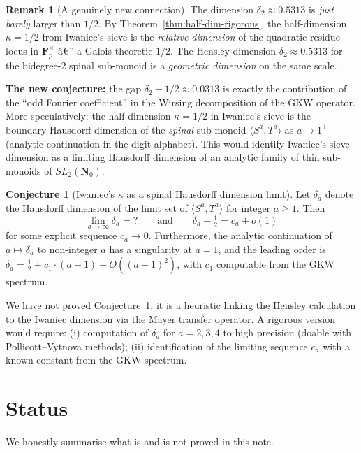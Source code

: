 ﻿\documentclass[11pt]{article}
\theoremstyle{definition}
\newtheorem{remark}[theorem]{Remark}
\newtheorem{conjecture}[theorem]{Conjecture}
\newcommand{\Nz}{\mathbf{N}_0}
\newcommand{\F}{\mathbf{F}}
\newcommand{\SLNz}{SL_2(\Nz)}
\begin{document}
\begin{remark}[A genuinely new connection]\label{rem:new-connection}
The dimension $\delta_2\approx 0.5313$ is \emph{just barely} larger than $1/2$. By Theorem~\ref{thm:half-dim-rigorous}, the half-dimension $\kappa=1/2$ from Iwaniec's sieve is the \emph{relative dimension} of the quadratic-residue locus in $\F_p^\times$ â€” a Galois-theoretic $1/2$. The Hensley dimension $\delta_2\approx 0.5313$ for the bidegree-$2$ spinal sub-monoid is a \emph{geometric dimension} on the same scale.

\textbf{The new conjecture:} the gap $\delta_2-1/2\approx 0.0313$ is exactly the contribution of the ``odd Fourier coefficient'' in the Wirsing decomposition of the GKW operator. More speculatively: the half-dimension $\kappa=1/2$ in Iwaniec's sieve is the boundary-Hausdorff dimension of the \emph{spinal} sub-monoid $\langle S^a,T^a\rangle$ as $a\to 1^+$ (analytic continuation in the digit alphabet). This would identify Iwaniec's sieve dimension as a limiting Hausdorff dimension of an analytic family of thin sub-monoids of $\SLNz$.
\end{remark}

\begin{conjecture}[Iwaniec's $\kappa$ as a spinal Hausdorff dimension limit]\label{conj:spinal-limit}
Let $\delta_a$ denote the Hausdorff dimension of the limit set of $\langle S^a,T^a\rangle$ for integer $a\ge 1$. Then
\[
\lim_{a\to\infty}\delta_a = ?\qquad\text{and}\qquad \delta_a - \tfrac{1}{2} = c_a + o(1)
\]
for some explicit sequence $c_a\to 0$. Furthermore, the analytic continuation of $a\mapsto\delta_a$ to non-integer $a$ has a singularity at $a=1$, and the leading order is $\delta_a=\tfrac{1}{2}+c_1\cdot(a-1)+O((a-1)^2)$, with $c_1$ computable from the GKW spectrum.
\end{conjecture}

We have not proved Conjecture~\ref{conj:spinal-limit}; it is a heuristic linking the Hensley calculation to the Iwaniec dimension via the Mayer transfer operator. A rigorous version would require: (i) computation of $\delta_a$ for $a=2,3,4$ to high precision (doable with Pollicott--Vytnova methods); (ii) identification of the limiting sequence $c_a$ with a known constant from the GKW spectrum.

\section{Status}\label{sec:status}

We honestly summarise what is and is not proved in this note.
\end{document}
